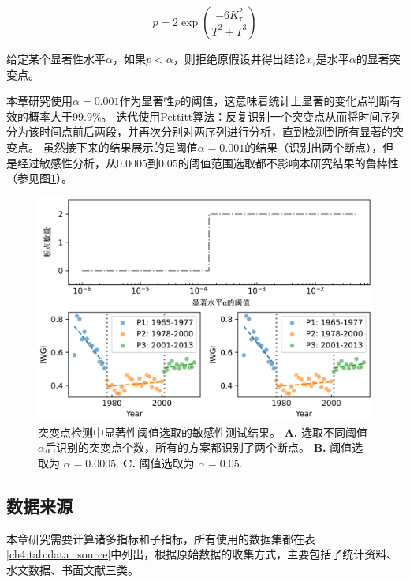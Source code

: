 \begin{equation}
    p=2 \exp \left(\frac{-6 K_{\tau}^{2}}{T^{2}+T^{3}}\right)
\end{equation}

给定某个显著性水平$\alpha$，如果$p < \alpha$，则拒绝原假设并得出结论$x_{\tau}$是水平$\alpha$的显著突变点。

本章研究使用$\alpha = 0.001$作为显著性$p$的阈值，这意味着统计上显著的变化点判断有效的概率大于$99.9\%$。
迭代使用Pettitt算法：反复识别一个突变点从而将时间序列分为该时间点前后两段，并再次分别对两序列进行分析，直到检测到所有显著的突变点。
虽然接下来的结果展示的是阈值$\alpha = 0.001$的结果（识别出两个断点），但是经过敏感性分析，从$0.0005$到$0.05$的阈值范围选取都不影响本研究结果的鲁棒性（参见图\ref{ch4:fig:sensitivity}）。

\begin{figure}[htb] %
    \includegraphics[width=\textwidth]{img/ch4/ch4_sensitivity.png}
    \caption[突变点检测中显著性阈值选取的敏感性测试]{突变点检测中显著性阈值选取的敏感性测试结果。
    \textbf{A.} 选取不同阈值$\alpha$后识别的突变点个数，所有的方案都识别了两个断点。
    \textbf{B.} 阈值选取为 $\alpha=0.0005$.
    \textbf{C.} 阈值选取为 $\alpha=0.05$.}\label{ch4:fig:sensitivity}
\end{figure}

\subsection{数据来源}
本章研究需要计算诸多指标和子指标，所有使用的数据集都在表\ref{ch4:tab:data_source}中列出，根据原始数据的收集方式，主要包括了统计资料、水文数据、书面文献三类。

